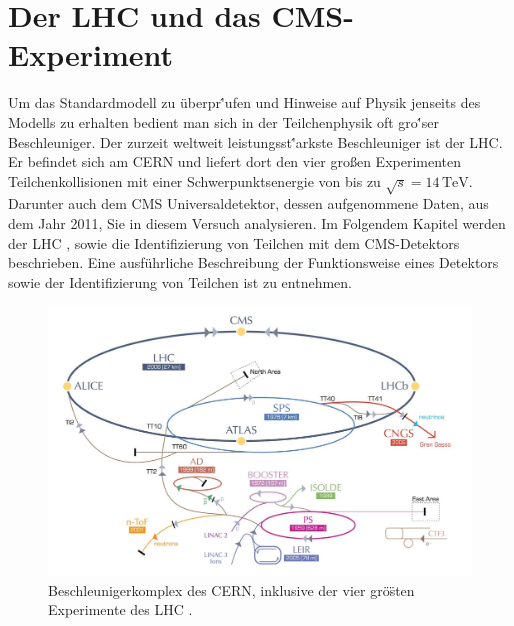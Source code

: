 \section{Der LHC und das CMS-Experiment}
\label{lhccms_chapter}
Um das Standardmodell zu \"uberpr\''ufen und Hinweise auf Physik jenseits des Modells zu erhalten bedient man sich in der Teilchenphysik oft gro\''ser Beschleuniger. Der zurzeit weltweit leistungsst\''arkste Beschleuniger ist der LHC. Er befindet sich am CERN und liefert dort den vier gro\ss{}en Experimenten Teilchenkollisionen mit einer Schwerpunktsenergie von bis zu $\sqrt{s} = 14\,\mathrm{TeV}$. Darunter auch dem CMS Universaldetektor, dessen aufgenommene Daten, aus dem Jahr 2011, Sie in diesem Versuch analysieren. 
Im Folgendem Kapitel werden der LHC \cite{LHC}, sowie die Identifizierung von Teilchen mit dem CMS-Detektors beschrieben. Eine ausf\"uhrliche Beschreibung der Funktionsweise eines Detektors sowie der Identifizierung von Teilchen ist \cite{Kleinknecht:1984jt,Grupen:PD} zu entnehmen. 
\begin{figure}[t]
	\centering
	\includegraphics[scale=0.35]{LHC/CERNkomplex}
	\caption[Beschleunigerkomplex des CERN]{Beschleunigerkomplex des CERN, inklusive der vier gr\"o\"sten Experimente des LHC \cite{cernkomplex}.}
	\label{cernkomplex}
\end{figure}

